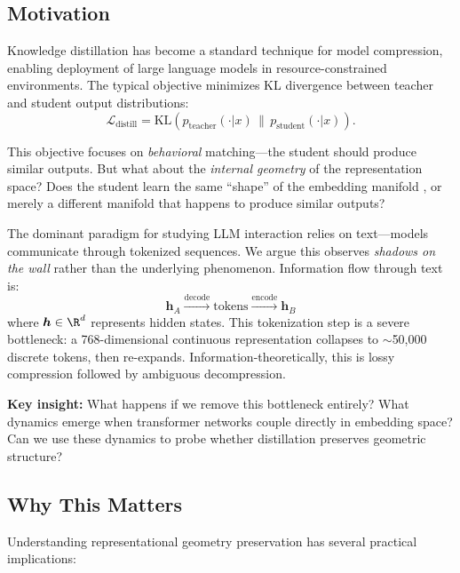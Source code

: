 \documentclass[10pt]{article} %
\theoremstyle{plain}
\theoremstyle{definition}
\theoremstyle{remark}
\renewcommand{\vect}[1]{\bm{#1}}
\begin{document}
\subsection{Motivation}

Knowledge distillation \cite{hinton2015distilling,gou2021knowledge} has become a standard technique for model compression, enabling deployment of large language models in resource-constrained environments. The typical objective minimizes KL divergence between teacher and student output distributions:
\begin{equation}
    \mathcal{L}_{\text{distill}} = \text{KL}\left(p_{\text{teacher}}(\cdot | x) \,\|\, p_{\text{student}}(\cdot | x)\right).
\end{equation}

This objective focuses on \textit{behavioral} matching---the student should produce similar outputs. But what about the \textit{internal geometry} of the representation space? Does the student learn the same ``shape'' of the embedding manifold \cite{li2019deepgkd}, or merely a different manifold that happens to produce similar outputs?

The dominant paradigm for studying LLM interaction relies on text---models communicate through tokenized sequences. We argue this observes \textit{shadows on the wall} rather than the underlying phenomenon. Information flow through text is:
\begin{equation}
    \vect{h}_A \xrightarrow{\text{decode}} \text{tokens} \xrightarrow{\text{encode}} \vect{h}_B
\end{equation}
where $\vect{h} \in \R^d$ represents hidden states. This tokenization step is a severe bottleneck: a 768-dimensional continuous representation collapses to $\sim$50,000 discrete tokens, then re-expands. Information-theoretically, this is lossy compression followed by ambiguous decompression.

\textbf{Key insight:} What happens if we remove this bottleneck entirely? What dynamics emerge when transformer networks couple directly in embedding space? Can we use these dynamics to probe whether distillation preserves geometric structure?

\subsection{Why This Matters}

Understanding representational geometry preservation has several practical implications:
\end{document}
